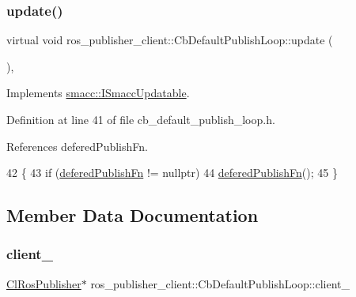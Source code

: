 \subsubsection{\texorpdfstring{update()}{update()}}
{\footnotesize\ttfamily virtual void ros\+\_\+publisher\+\_\+client\+::\+Cb\+Default\+Publish\+Loop\+::update (\begin{DoxyParamCaption}{ }\end{DoxyParamCaption})\hspace{0.3cm}{\ttfamily [inline]}, {\ttfamily [virtual]}}



Implements \hyperlink{classsmacc_1_1ISmaccUpdatable_a84ee0520cbefdb1d412bed54650b028e}{smacc\+::\+I\+Smacc\+Updatable}.



Definition at line 41 of file cb\+\_\+default\+\_\+publish\+\_\+loop.\+h.



References defered\+Publish\+Fn.


\begin{DoxyCode}
42     \{
43         \textcolor{keywordflow}{if} (\hyperlink{classros__publisher__client_1_1CbDefaultPublishLoop_a321f79f015449668a184cd30b6c2ad51}{deferedPublishFn} != \textcolor{keyword}{nullptr})
44             \hyperlink{classros__publisher__client_1_1CbDefaultPublishLoop_a321f79f015449668a184cd30b6c2ad51}{deferedPublishFn}();
45     \}
\end{DoxyCode}


\subsection{Member Data Documentation}
\mbox{\label{classros__publisher__client_1_1CbDefaultPublishLoop_a90fc344876c742774a73542e338c3bfd}} 
\subsubsection{\texorpdfstring{client\+\_\+}{client\_}}
{\footnotesize\ttfamily \hyperlink{classros__publisher__client_1_1ClRosPublisher}{Cl\+Ros\+Publisher}$\ast$ ros\+\_\+publisher\+\_\+client\+::\+Cb\+Default\+Publish\+Loop\+::client\+\_\+\hspace{0.3cm}{\ttfamily [private]}}



